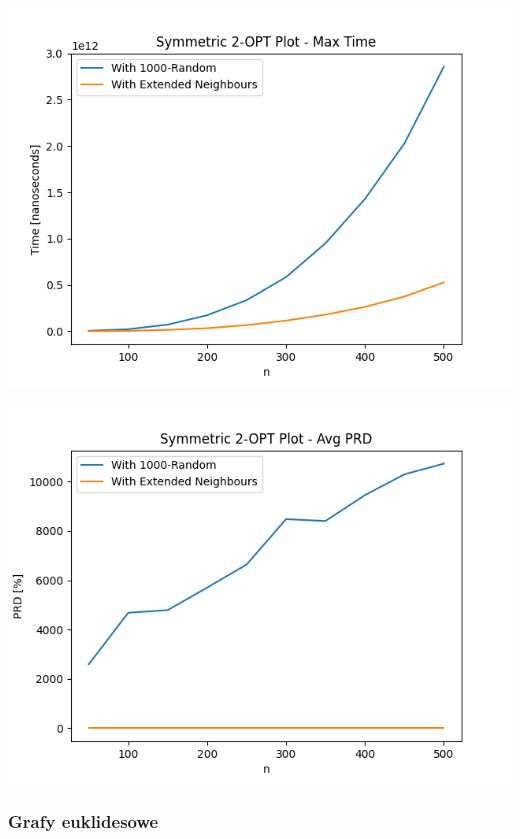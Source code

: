 \documentclass{article}
\begin{document}
\begin{center}
\includegraphics[width=\textwidth, 
                   height = 0.4\textheight, 
                   keepaspectratio]
                  {two_opt_sym_max_time} 
\end{center}

\begin{center}
\includegraphics[width=\textwidth, 
                   height = 0.4\textheight, 
                   keepaspectratio]
                  {two_opt_sym_avg_prd} 
\end{center}

\subsubsection{Grafy euklidesowe}
\end{document}

